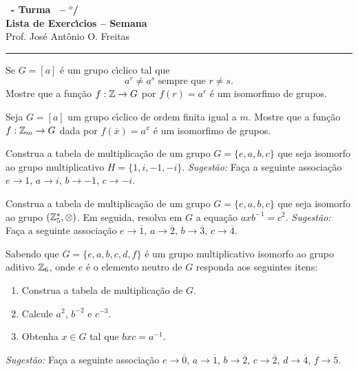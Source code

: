 \documentclass[12pt]{exam}
\begin{document}
\begin{center}
    
    {\Large\bf \disciplina\ - Turma \turma\ -- \semestre$^{o}$/\ano} \\ \vspace{9pt} {\large\bf
        Lista de Exerc{\'\i}cios -- Semana \numerosemana}\\ \vspace{9pt} Prof. Jos{\'e} Ant{\^o}nio O. Freitas
    \end{center}
    \hrule

    \vspace{.6cm}

    \questao{} Se $G = [a]$ \'e um grupo c{\'\i}clico tal que
    \[
        a^r \ne a^s \mbox{ sempre que } r \ne s.
    \]
    Mostre que a fun\c{c}\~ao $f : \mathbb{Z} \to G$ por $f(r) = a^r$ \'e um isomorfimo de grupos.
    
    \vspace{.3cm}

    \questao{} Seja $G = [a]$ um grupo c{\'\i}clico de ordem finita igual a $m$. Mostre que a fun\c{c}\~ao $f : \mathbb{Z}_m \to G$ dada por $f(\overline{x}) = a^x$ \'e um isomorfimo de grupos.

    \vspace{.3cm}

    \questao{} Construa a tabela de multiplicação de um grupo $G = \{e, a, b, c\}$ que seja isomorfo ao grupo multiplicativo $H = \{1, i, -1, -i\}$.
    \textit{Sugestão:} Faça a seguinte associação $e \to 1$, $a \to i$, $b \to -1$, $c \to -i$.

    \vspace{.3cm}
    
    \questao{} Construa a tabela de multiplicação de um grupo $G = \{e, a, b, c\}$ que seja isomorfo ao grupo $(\mathbb{Z}_5^*, \otimes)$. Em seguida, resolva em $G$ a equação $axb^{-1} = c^2$.
    \textit{Sugestão:} Faça a seguinte associação $e \to \overline{1}$, $a \to \overline{2}$, $b \to \overline{3}$, $c \to \overline{4}$.

    \vspace{.3cm}

    \questao{} Sabendo que $G = \{e, a, b, c, d, f\}$ é um grupo multiplicativo isomorfo ao grupo aditivo $\mathbb{Z}_6$, onde $e$ é o elemento neutro de $G$ responda aos seguintes itens:
    \begin{enumerate}
      \item Construa a tabela de multiplicação de $G$.

      \item Calcule $a^2$, $b^{-2}$ e $c^{-3}$.

      \item Obtenha $x \in G$ tal que $bxc = a^{-1}$.
    \end{enumerate}
    \textit{Sugestão:} Faça a seguinte associação $e \to \overline{0}$, $a \to \overline{1}$, $b \to \overline{2}$, $c \to \overline{2}$, $d \to \overline{4}$, $f \to \overline{5}$.
\end{document}
